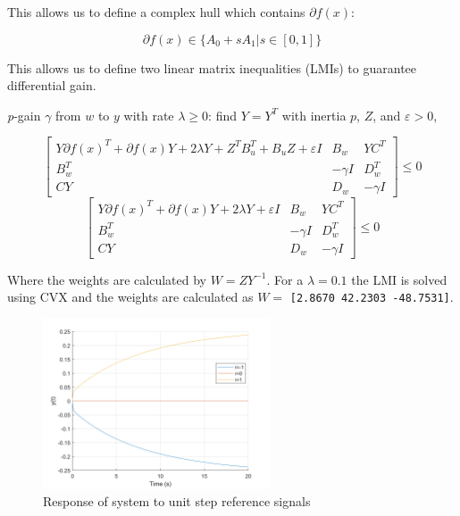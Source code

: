 \documentclass{article}
\begin{document}
This allows us to define a complex hull which contains $\partial f(x)$:

\begin{equation}
    \partial f(x) \in \{ A_0 + sA_1 | s \in [0,1]\}
\end{equation}

This allows us to define two linear matrix inequalities (LMIs) to guarantee differential gain. 

\textit{p}-gain $\gamma$ from $w$ to $y$ with rate $\lambda \geq 0$: find $Y = Y^T$ with inertia $p$, $Z$, and $\varepsilon > 0$,

\begin{equation}
    \left[
    \begin{array}{ccc}
    Y \partial f(x)^T + \partial f(x) Y + 2 \lambda Y + Z^T B_u^T + B_u Z + \varepsilon I & B_w & YC^T \\
    B_w^T & -\gamma I & D_w^T \\
    CY & D_w & -\gamma I
    \end{array}
    \right] \leq 0
\end{equation}
\begin{equation}
    \left[
    \begin{array}{ccc}
    Y \partial f(x)^T + \partial f(x) Y + 2 \lambda Y + \varepsilon I & B_w & YC^T \\
    B_w^T & -\gamma I & D_w^T \\
    CY & D_w & -\gamma I
    \end{array}
    \right] \leq 0
\end{equation}

Where the weights are calculated by $W = ZY^{-1}$.
For a $\lambda = 0.1$ the LMI is solved using CVX and the weights are calculated as $W =$ \texttt{[2.8670   42.2303  -48.7531]}.

\begin{figure}[H]
    \centering
    \includegraphics[width=0.6\textwidth]{figures/11_step_reference.png}
    \caption{Response of system to unit step reference signals}
    \label{fig:11_step}
\end{figure}
\end{document}
